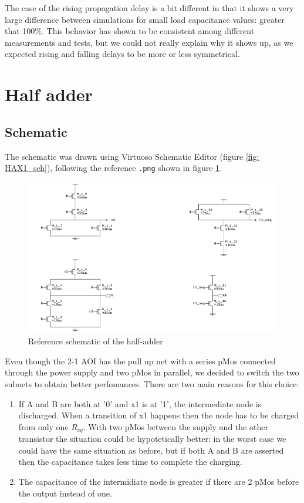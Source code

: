 \documentclass[a4paper]{article}
\begin{document}
The case of the rising propagation delay is a bit different in that it shows a very large difference between simulations for small load capacitance values: greater that 100\%. This behavior has shown to be consistent among different measurements and tests, but we could not really explain why it shows up, as we expected rising and falling delays to be more or less symmetrical.

\section{Half adder}
\subsection{Schematic}
The schematic was drawn using Virtuoso Schematic Editor (figure \ref{fig: HAX1_sch}), following the reference \texttt{.png} shown in figure \ref{fig: HAX1_png}.

\begin{figure}[H]
	\includegraphics[width=0.9\linewidth]{./Images/HA/HA_X1.png}
	\caption{Reference schematic of the half-adder}
	\label{fig: HAX1_png}
\end{figure}

Even though the 2-1 AOI has the pull up net with a series pMos connected through the power supply and two pMos in parallel, we decided to switch the two subnets to obtain better perfomances. There are two main reasons for this choice:
\begin{enumerate}
\item If A and B are both at '0' and x1 is at '1', the intermediate node is discharged. When a transition of x1 happens then the node has to be charged from only one $R_{eq}$. With two pMos between the supply and the other transistor the situation could be hypotetically better: in the worst case we could have the same situation as before, but if both A and B are asserted then the capacitance takes less time to complete the charging.
\item The capacitance of the intermidiate node is greater if there are 2 pMos before the output instead of one.
\end{enumerate}
\end{document}
